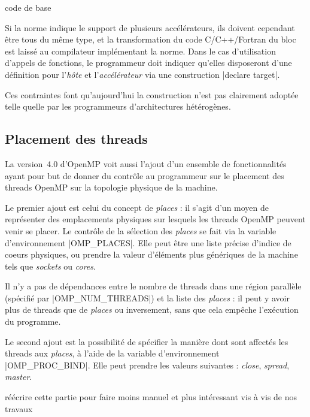 \begin{todo}
  code de base
\end{todo}


Si la norme indique le support de plusieurs accélérateurs, ils doivent cependant être tous du même type, et la transformation du code C/C++/Fortran du bloc est laissé au compilateur implémentant la norme.
Dans le cas d'utilisation d'appels de fonctions, le programmeur doit indiquer qu'elles disposeront d'une définition pour l'\emph{hôte} et l'\emph{accélérateur} via une construction |declare target|.

Ces contraintes font qu'aujourd'hui la construction n'est pas clairement adoptée telle quelle par les programmeurs d'architectures hétérogènes.

\subsection{Placement des threads}

La version~4.0 d'OpenMP voit aussi l'ajout d'un ensemble de fonctionnalités ayant pour but de donner du contrôle au programmeur sur le placement des threads OpenMP sur la topologie physique de la machine.

Le premier ajout est celui du concept de \emph{places} : il s'agit d'un moyen de représenter des emplacements physiques sur lesquels les threads OpenMP peuvent venir se placer.
Le contrôle de la sélection des \emph{places} se fait via la variable d'environnement |OMP_PLACES|.
Elle peut être une liste précise d'indice de coeurs physiques, ou prendre la valeur d'éléments plus génériques de la machine tels que \emph{sockets} ou \emph{cores}.

Il n'y a pas de dépendances entre le nombre de threads dans une région parallèle (spécifié par |OMP_NUM_THREADS|) et la liste des \emph{places} : il peut y avoir plus de threads que de \emph{places} ou inversement, sans que cela empêche l'exécution du programme.

Le second ajout est la possibilité de spécifier la manière dont sont affectés les threads aux \emph{places}, à l'aide de la variable d'environnement |OMP_PROC_BIND|.
Elle peut prendre les valeurs suivantes : \emph{close}, \emph{spread}, \emph{master}.

\begin{todo}
réécrire cette partie pour faire moins manuel et plus intéressant vis à vis de nos travaux
\end{todo}

